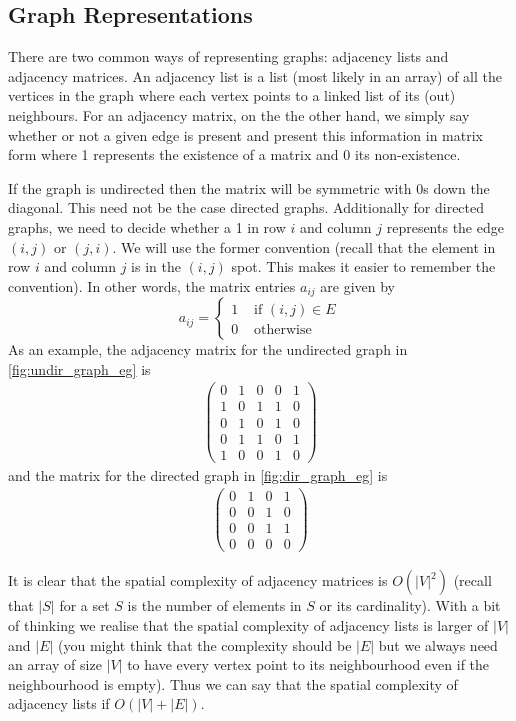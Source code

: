 \subsection{Graph Representations}

There are two common ways of representing graphs: adjacency lists and adjacency matrices. An adjacency list is a list (most likely in an array) of all the vertices in the graph where each vertex points to a linked list of its (out) neighbours. For an adjacency matrix, on the the other hand, we simply say whether or not a given edge is present and present this information in matrix form where 1 represents the existence of a matrix and 0 its non-existence. 

If the graph is undirected then the matrix will be symmetric with 0s down the diagonal. This need not be the case directed graphs. Additionally for directed graphs, we need to decide whether a 1 in row $i$ and column $j$ represents the edge $(i, j)$ or $(j, i)$. We will use the former convention (recall that the element in row $i$ and column $j$ is in the $(i, j)$ spot. This makes it easier to remember the convention). In other words, the matrix entries $a_{ij}$ are given by
$$ a_{ij} = \begin{cases}
1 &\text{ if } (i, j) \in E\\
0 &\text{ otherwise}
\end{cases}
$$
As an example, the adjacency matrix for the undirected graph in \autoref{fig:undir_graph_eg} is
\begin{align*}
    \begin{pmatrix}
    0 & 1 & 0 & 0 & 1\\
    1 & 0 & 1 & 1 & 0\\
    0 & 1 & 0 & 1 & 0\\
    0 & 1 & 1 & 0 & 1\\
    1 & 0 & 0 & 1 & 0
    \end{pmatrix}
\end{align*}
and the matrix for the directed graph in \autoref{fig:dir_graph_eg} is
\begin{align*}
    \begin{pmatrix}
        0 & 1 & 0 & 1\\
        0 & 0 & 1 & 0\\
        0 & 0 & 1 & 1\\
        0 & 0 & 0 & 0
    \end{pmatrix}
\end{align*}

It is clear that the spatial complexity of adjacency matrices is $O(|V|^2)$ (recall that $|S|$ for a set $S$ is the number of elements in $S$ or its cardinality). With a bit of thinking we realise that the spatial complexity of adjacency lists is larger of $|V|$ and $|E|$ (you might think that the complexity should be $|E|$ but we always need an array of size $|V|$ to have every vertex point to its neighbourhood even if the neighbourhood is empty). Thus we can say that the spatial complexity of adjacency lists if $O(|V| + |E|)$.

